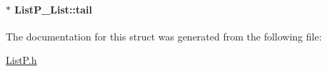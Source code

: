 \paragraph[{tail}]{$\ast$ List\+P\+\_\+\+List\+::tail}\label{struct_list_p___list_a917e6cc15b641c716a5919386f47183b}


The documentation for this struct was generated from the following file\+:\begin{DoxyCompactItemize}
\item 
\hyperlink{_list_p_8h}{List\+P.\+h}\end{DoxyCompactItemize}
